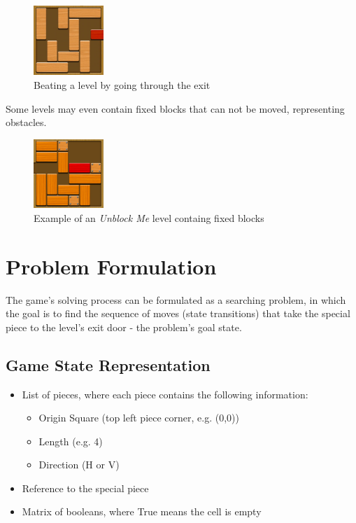 \documentclass[conference]{IEEEtran}
\begin{document}
\begin{figure}[H]
    \centerline{\includegraphics[width=100px]{img3.png}}
    \caption{Beating a level by going through the exit}
    \label{img:final_state}
\end{figure}

Some levels may even contain fixed blocks that can not be moved, representing obstacles.
 
\begin{figure}[H]
    \centerline{\includegraphics[width=100px]{img4.png}}
    \caption{Example of an \textit{Unblock Me} level containg fixed blocks}
\end{figure}

\section{Problem Formulation}
The game's solving process can be formulated as a searching problem, in which the goal is to find the sequence of moves (state transitions) that take the special piece to the level's exit door - the problem's goal state. 

\subsection{Game State Representation} \label{subsec:gr}

\begin{itemize}
    \item List of pieces, where each piece contains the following information:
    \begin{itemize}
        \item Origin Square (top left piece corner, e.g. (0,0))
        \item Length (e.g. 4)
        \item Direction (H or V)
    \end{itemize}
    \item Reference to the special piece
    \item Matrix of booleans, where True means the cell is empty
\end{itemize}
\end{document}
